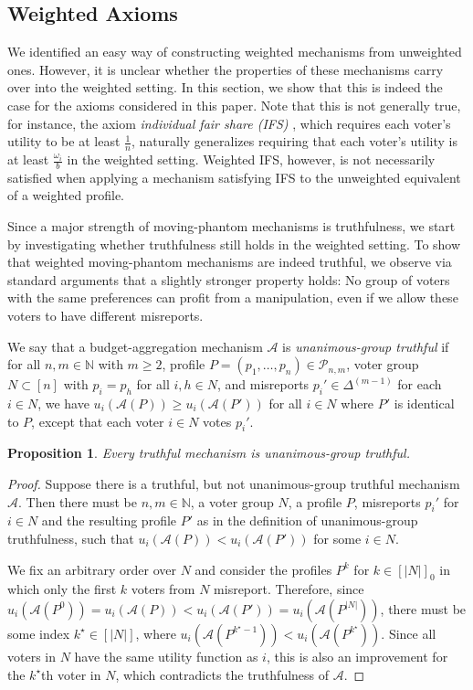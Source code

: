 \documentclass[11pt]{article}
\newcommand{\A}{\mathcal{A}}
\newcommand{\N}{\mathbb{N}}
\newcommand{\p}{p}   %
\newtheorem{proposition}{Proposition}
\begin{document}
\subsection{Weighted Axioms}

We identified an easy way of constructing weighted mechanisms from unweighted ones. However, it is unclear whether the properties of these mechanisms carry over into the weighted setting. In this section, we show that this is indeed the case for the axioms considered in this paper. Note that this is not generally true, for instance, the axiom \textit{individual fair share (IFS)} \citep{bogomolnaia2005collective,brandl2021distribution}, which requires each voter's utility to be at least $\frac{1}{n}$, naturally generalizes requiring that each voter's utility is at least $\frac{\omega_i}{b}$ in the weighted setting. Weighted IFS, however, is not necessarily satisfied when applying a mechanism satisfying IFS to the unweighted equivalent of a weighted profile. 

Since a major strength of moving-phantom mechanisms is truthfulness, we start by investigating whether truthfulness still holds in the weighted setting. To show that weighted moving-phantom mechanisms are indeed truthful, we 
observe via standard arguments that a slightly stronger property holds:
No group of voters with the same preferences can profit from a manipulation, even if we allow these voters to have different misreports.

We say that a budget-aggregation mechanism $\A$ is \emph{unanimous-group truthful} if for all $n, m \in \N$ with $m \ge 2$, profile $P = (\p_1, \dots, \p_n) \in \mathcal{P}_{n,m}$, voter group $N \subset [n]$ with $p_i = p_h$ for all $i,h \in N$, and misreports $\p_i' \in \Delta^{(m-1)}$ for each $i \in N$, we have $u_i(\A(P)) \ge u_i(\A(P'))$ for all $i \in N$ where $P'$ is identical to $P$, except that each voter $i \in N$ votes $p_i'$.

\begin{proposition}
    Every truthful mechanism is unanimous-group truthful.
\end{proposition}

\begin{proof}
    Suppose there is a truthful, but not unanimous-group truthful mechanism $\A$. Then there must be $n,m \in \N$, a voter group $N$, a profile $P$, misreports $p_i'$ for $i \in N$ and the resulting profile $P'$ as in the definition of unanimous-group truthfulness, such that $u_i(\A(P)) < u_i(\A(P'))$ for some $i \in N$.

    We fix an arbitrary order over $N$ and consider the profiles $P^k$ for $k \in [|N|]_0$ in which only the first $k$ voters from $N$ misreport. Therefore, since $u_i(\A(P^0)) = u_i(\A(P)) < u_i(\A(P')) = u_i(\A(P^{|N|}))$, there must be some index $k^\star \in [|N|]$, where $u_i(\A(P^{k^\star-1})) < u_i(\A(P^{k^\star}))$. Since all voters in $N$ have the same utility function as $i$, this is also an improvement for the $k^\star$th voter in $N$, which contradicts the truthfulness of $\A$. 
\end{proof}
\end{document}
